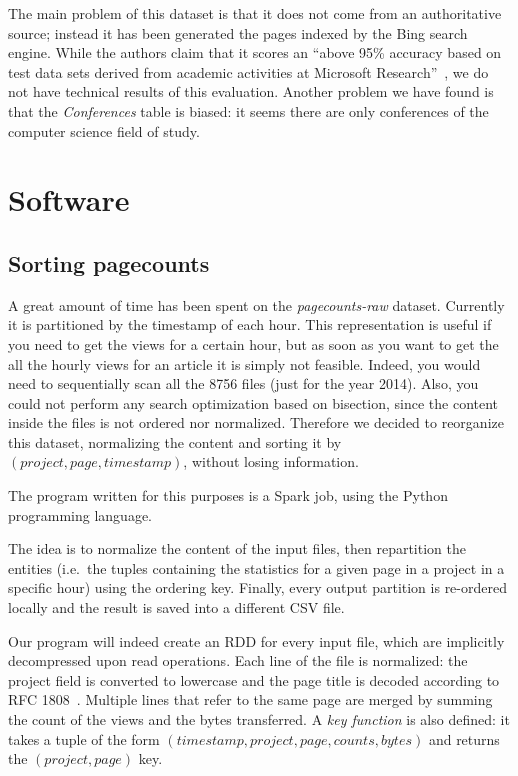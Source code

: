 The main problem of this dataset is that it does not come from an authoritative source; instead it has been generated the pages indexed by the Bing search engine.
While the authors claim that it scores an ``above 95\% accuracy based on test data sets derived from academic activities at Microsoft Research''~\cite{Sinha2015}, we do not have technical results of this evaluation.
Another problem we have found is that the \emph{Conferences} table is biased: it seems there are only conferences of the computer science field of study.


\section{Software}
\label{sec:software}
\subsection{Sorting pagecounts}
\label{sub:Sorting pagecounts}
A great amount of time has been spent on the \emph{pagecounts-raw} dataset.
Currently it is partitioned by the timestamp of each hour.
This representation is useful if you need to get the views for a certain hour, but as soon as you want to get the all the hourly views for an article it is simply not feasible.
Indeed, you would need to sequentially scan all the 8756 files (just for the year 2014).
Also, you could not perform any search optimization based on bisection, since the content inside the files is not ordered nor normalized.
Therefore we decided to reorganize this dataset, normalizing the content and sorting it by $(project, page, timestamp)$, without losing information.

The program written for this purposes is a Spark job, using the Python programming language.

The idea is to normalize the content of the input files, then repartition the entities (i.e.\ the tuples containing the statistics for a given page in a project in a specific hour) using the ordering key.
Finally, every output partition is re-ordered locally and the result is saved into a different CSV file.

Our program will indeed create an \ac{RDD} for every input file, which are implicitly decompressed upon read operations.
Each line of the file is normalized: the project field is converted to lowercase and the page title is decoded according to RFC 1808~\cite{rfc1808}.
Multiple lines that refer to the same page are merged by summing the count of the views and the bytes transferred.
A \emph{key function} is also defined: it takes a tuple of the form $(timestamp, project, page, counts, bytes)$ and returns the $(project, page)$ key.

